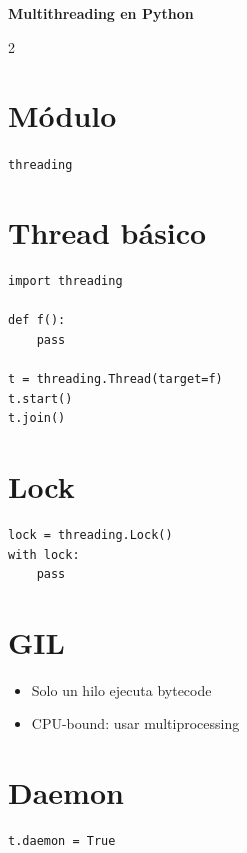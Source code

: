 \documentclass[a4paper,10pt]{article}
\begin{document}
\begin{center}
{\Large \textbf{Multithreading en Python}}
\end{center}

\begin{multicols}{2}

\section*{Módulo}
\texttt{threading}

\section*{Thread básico}
\begin{lstlisting}
import threading

def f():
    pass

t = threading.Thread(target=f)
t.start()
t.join()
\end{lstlisting}

\section*{Lock}
\begin{lstlisting}
lock = threading.Lock()
with lock:
    pass
\end{lstlisting}

\section*{GIL}
\begin{itemize}
\item Solo un hilo ejecuta bytecode
\item CPU-bound: usar multiprocessing
\end{itemize}

\section*{Daemon}
\begin{lstlisting}
t.daemon = True
\end{lstlisting}

\end{multicols}
\end{document}
